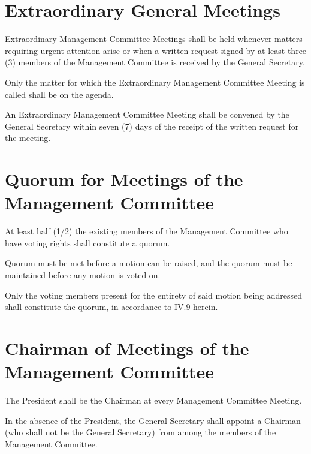 \section{Extraordinary General Meetings}
Extraordinary Management Committee Meetings shall be held whenever matters requiring urgent attention arise or when a written request signed by at least three (3) members of the Management Committee is received by the General Secretary.
	\begin{legal}
	\item Only the matter for which the Extraordinary Management Committee Meeting is called shall be on the agenda.
	\item An Extraordinary Management Committee Meeting shall be convened by the General Secretary within seven (7) days of the receipt of the written request for the meeting.
	\end{legal}

\section{Quorum for Meetings of the Management Committee}
At least half (1/2) the existing members of the Management Committee who have voting rights shall constitute a quorum.
	\begin{legal}
	\item Quorum must be met before a motion can be raised, and the quorum must be maintained before any motion is voted on.
	\item Only the voting members present for the entirety of said motion being addressed shall constitute the quorum, in accordance to IV.9 herein.
	\end{legal}

\section{Chairman of Meetings of the Management Committee}
The President shall be the Chairman at every Management Committee Meeting.
	\begin{legal}
	\item In the absence of the President, the General Secretary shall appoint a Chairman (who shall not be the General Secretary) from among the members of the Management Committee.
	\end{legal}

